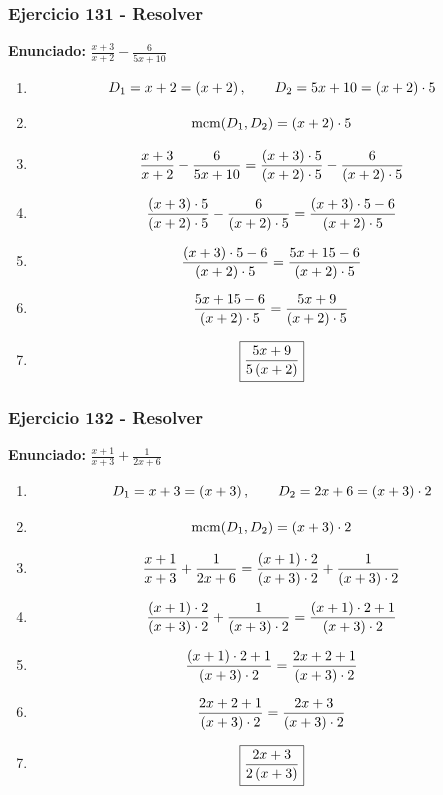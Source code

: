 \documentclass[11pt,a4paper]{article}
\newcommand{\fitmath}[1]{%
\[
\setbox0=\hbox{$\displaystyle #1$}%
\ifdim\wd0>\linewidth
\resizebox{\linewidth}{!}{$\displaystyle #1$}%
\else
#1%
\fi
\]
}
\begin{document}
\vspace{0.12cm}
\subsubsection*{Ejercicio 131 - Resolver}
\textbf{Enunciado:} $ \frac{x + 3}{x + 2} - \frac{6}{5 x + 10} $\par
\begin{enumerate}[leftmargin=2em]
\item \fitmath{D_1=x + 2=\left(x + 2\right),\qquad D_2=5 x + 10=\left(x + 2\right)\cdot 5}
\item \fitmath{\operatorname{mcm}(D_1,D_2)=\left(x + 2\right)\cdot 5}
\item \fitmath{\frac{x + 3}{x + 2} - \frac{6}{5 x + 10}= \frac{\left(x + 3\right)\cdot 5}{\left(x + 2\right)\cdot 5} - \frac{6}{\left(x + 2\right)\cdot 5}}
\item \fitmath{\frac{\left(x + 3\right)\cdot 5}{\left(x + 2\right)\cdot 5} - \frac{6}{\left(x + 2\right)\cdot 5}=\frac{\left(x + 3\right)\cdot 5 - 6}{\left(x + 2\right)\cdot 5}}
\item \fitmath{\frac{\left(x + 3\right)\cdot 5 - 6}{\left(x + 2\right)\cdot 5}=\frac{5 x + 15 - 6}{\left(x + 2\right)\cdot 5}}
\item \fitmath{\frac{5 x + 15 - 6}{\left(x + 2\right)\cdot 5}=\frac{5 x + 9}{\left(x + 2\right)\cdot 5}}
\item \fitmath{\boxed{\frac{5 x + 9}{5 \left(x + 2\right)}}}
\end{enumerate}

\vspace{0.12cm}
\subsubsection*{Ejercicio 132 - Resolver}
\textbf{Enunciado:} $ \frac{x + 1}{x + 3} + \frac{1}{2 x + 6} $\par
\begin{enumerate}[leftmargin=2em]
\item \fitmath{D_1=x + 3=\left(x + 3\right),\qquad D_2=2 x + 6=\left(x + 3\right)\cdot 2}
\item \fitmath{\operatorname{mcm}(D_1,D_2)=\left(x + 3\right)\cdot 2}
\item \fitmath{\frac{x + 1}{x + 3} + \frac{1}{2 x + 6}= \frac{\left(x + 1\right)\cdot 2}{\left(x + 3\right)\cdot 2} + \frac{1}{\left(x + 3\right)\cdot 2}}
\item \fitmath{\frac{\left(x + 1\right)\cdot 2}{\left(x + 3\right)\cdot 2} + \frac{1}{\left(x + 3\right)\cdot 2}=\frac{\left(x + 1\right)\cdot 2 + 1}{\left(x + 3\right)\cdot 2}}
\item \fitmath{\frac{\left(x + 1\right)\cdot 2 + 1}{\left(x + 3\right)\cdot 2}=\frac{2 x + 2 + 1}{\left(x + 3\right)\cdot 2}}
\item \fitmath{\frac{2 x + 2 + 1}{\left(x + 3\right)\cdot 2}=\frac{2 x + 3}{\left(x + 3\right)\cdot 2}}
\item \fitmath{\boxed{\frac{2 x + 3}{2 \left(x + 3\right)}}}
\end{enumerate}
\end{document}
